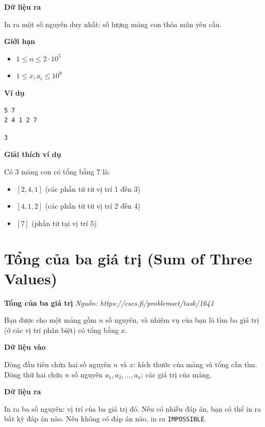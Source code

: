 \documentclass[12pt,a4paper]{article}
\newcommand{\problem}[2]{%
  \begin{mdframed}[
    linecolor=framecolor,
    linewidth=1.5pt,
    backgroundcolor=white,
    topline=true, bottomline=true,
    leftline=true, rightline=true,
    innerleftmargin=10pt, innerrightmargin=10pt,
    innertopmargin=6pt, innerbottommargin=6pt,
  ]
  \textbf{\large #1} \hfill \textit{Nguồn: #2}
  \end{mdframed}
  \vspace{4pt}%
}
\newcommand{\inputformat}{%
  \vspace{6pt}\textbf{\textcolor{sectioncolor}{Dữ liệu vào}}\par\vspace{2pt}%
}
\newcommand{\outputformat}{%
  \vspace{6pt}\textbf{\textcolor{sectioncolor}{Dữ liệu ra}}\par\vspace{2pt}%
}
\newcommand{\constraints}{%
  \vspace{6pt}\textbf{\textcolor{sectioncolor}{Giới hạn}}\par\vspace{2pt}%
}
\newcommand{\example}{%
  \vspace{6pt}\textbf{\textcolor{sectioncolor}{Ví dụ}}\par\vspace{2pt}%
}
\newcommand{\explanation}{%
  \vspace{6pt}\textbf{\textcolor{sectioncolor}{Giải thích ví dụ}}\par\vspace{2pt}%
}
\begin{document}
\outputformat
\begin{outputbox}
In ra một số nguyên duy nhất: số lượng mảng con thỏa mãn yêu cầu.
\end{outputbox}

\constraints
\begin{constraintbox}
\begin{itemize}[leftmargin=*,nosep]
    \item $1 \le n \le 2 \cdot 10^5$
    \item $1 \le x, a_i \le 10^9$
\end{itemize}
\end{constraintbox}

\example
\begin{lstlisting}
5 7
2 4 1 2 7
\end{lstlisting}
\begin{lstlisting}
3
\end{lstlisting}

\explanation
Có $3$ mảng con có tổng bằng $7$ là:
\begin{itemize}[leftmargin=*,nosep]
    \item $[2, 4, 1]$ (các phần tử từ vị trí 1 đến 3)
    \item $[4, 1, 2]$ (các phần tử từ vị trí 2 đến 4)
    \item $[7]$ (phần tử tại vị trí 5)
\end{itemize}


\section{Tổng của ba giá trị (Sum of Three Values)}

\problem{Tổng của ba giá trị}{https://cses.fi/problemset/task/1641}

Bạn được cho một mảng gồm $n$ số nguyên, và nhiệm vụ của bạn là tìm ba giá trị (ở các vị trí phân biệt) có tổng bằng $x$.

\inputformat
\begin{inputbox}
Dòng đầu tiên chứa hai số nguyên $n$ và $x$: kích thước của mảng và tổng cần tìm.\\
Dòng thứ hai chứa $n$ số nguyên $a_1, a_2, \dots, a_n$: các giá trị của mảng.
\end{inputbox}

\outputformat
\begin{outputbox}
In ra ba số nguyên: vị trí của ba giá trị đó. Nếu có nhiều đáp án, bạn có thể in ra bất kỳ đáp án nào. Nếu không có đáp án nào, in ra \texttt{IMPOSSIBLE}.
\end{outputbox}
\end{document}

